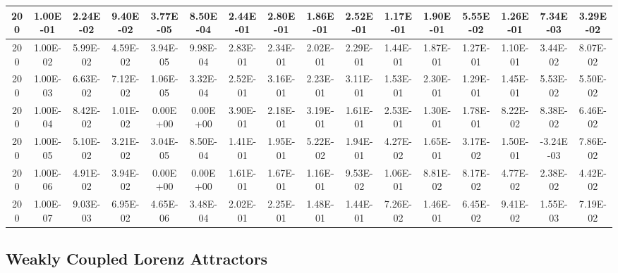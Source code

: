 \begin{table}[H]
\begin{center}
{\begin{tabular}{|c|c|c|c|c|c|c|c|c|c|c|c|c|c|c|c|}
200    &    1.00E-01    &    2.24E-02    &    9.40E-02    &    3.77E-05    &    8.50E-04    &    2.44E-01    &    2.80E-01    &    1.86E-01    &    2.52E-01    &    1.17E-01    &    1.90E-01    &    5.55E-02    &    1.26E-01    &    7.34E-03    &    3.29E-02    \\ \hline
200    &    1.00E-02    &    5.99E-02    &    4.59E-02    &    3.94E-05    &    9.98E-04    &    2.83E-01    &    2.34E-01    &    2.02E-01    &    2.29E-01    &    1.44E-01    &    1.87E-01    &    1.27E-01    &    1.10E-01    &    3.44E-02    &    8.07E-02    \\ \hline
200    &    1.00E-03    &    6.63E-02    &    7.12E-02    &    1.06E-05    &    3.32E-04    &    2.52E-01    &    3.16E-01    &    2.23E-01    &    3.11E-01    &    1.53E-01    &    2.30E-01    &    1.29E-01    &    1.45E-01    &    5.53E-02    &    5.50E-02    \\ \hline
200    &    1.00E-04    &    8.42E-02    &    1.01E-02    &    0.00E+00    &    0.00E+00    &    3.90E-01    &    2.18E-01    &    3.19E-01    &    1.61E-01    &    2.53E-01    &    1.30E-01    &    1.78E-01    &    8.22E-02    &    8.38E-02    &    6.46E-02    \\ \hline
200    &    1.00E-05    &    5.10E-02    &    3.21E-02    &    3.04E-05    &    8.50E-04    &    1.41E-01    &    1.95E-01    &    5.22E-02    &    1.94E-01    &    4.27E-02    &    1.65E-01    &    3.17E-02    &    1.50E-01    &    -3.24E-03    &    7.86E-02    \\ \hline
200    &    1.00E-06    &    4.91E-02    &    3.94E-02    &    0.00E+00    &    0.00E+00    &    1.61E-01    &    1.67E-01    &    1.16E-01    &    9.53E-02    &    1.06E-01    &    8.81E-02    &    8.17E-02    &    4.77E-02    &    2.38E-02    &    4.42E-02    \\ \hline
200    &    1.00E-07    &    9.03E-03    &    6.95E-02    &    4.65E-06    &    3.48E-04    &    2.02E-01    &    2.25E-01    &    1.48E-01    &    1.44E-01    &    7.26E-02    &    1.46E-01    &    6.45E-02    &    9.41E-02    &    1.55E-03    &    7.19E-02    \\ \hline
\end{tabular} 
}
\end{center}
\end{table}

\subsection{Weakly Coupled Lorenz Attractors}

